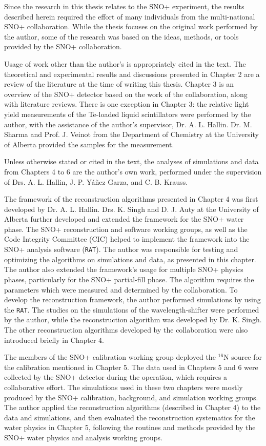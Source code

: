 Since the research in this thesis relates to the SNO+ experiment, the results described herein required the effort of many individuals from the multi-national SNO+ collaboration. While the thesis focuses on the original work performed by the author, some of the research was based on the ideas, methods, or tools provided by the SNO+ collaboration.

Usage of work other than the author's is appropriately cited in the text. The theoretical and experimental results and discussions presented in Chapter 2 are a review of the literature at the time of writing this thesis. Chapter 3 is an overview of the SNO+ detector based on the work of the collaboration, along with literature reviews. There is one exception in Chapter 3: the relative light yield measurements of the Te-loaded liquid scintillators were performed by the author, with the assistance of the author's supervisor, Dr. A. L. Hallin. Dr. M. Sharma and Prof. J. Veinot from the Department of Chemistry at the University of Alberta provided the samples for the measurement.

Unless otherwise stated or cited in the text, the analyses of simulations and data from Chapters 4 to 6 are the author's own work, performed under the supervision of Drs. A. L. Hallin, J. P. Y\'{a}\~{n}ez Garza, and C. B. Krauss.

The framework of the reconstruction algorithms presented in Chapter 4 was first developed by Dr. A. L. Hallin. Drs. K. Singh and D. J. Auty at the University of Alberta further developed and extended the framework for the SNO+ water phase. The SNO+ reconstruction and software working groups, as well as the Code Integrity Committee (CIC) helped to implement the framework into the SNO+ analysis software (\texttt{RAT}). The author was responsible for testing and optimizing the algorithms on simulations and data, as presented in this chapter. The author also extended the framework's usage for multiple SNO+ physics phases, particularly for the SNO+ partial-fill phase. The algorithm requires the parameters which were measured and determined by the collaboration. To develop the reconstruction framework, the author performed simulations by using the \texttt{RAT}. The studies on the simulations of the wavelength-shifter were performed by the author, while the reconstruction algorithm was developed by Dr. K. Singh. The other reconstruction algorithms developed by the collaboration were also introduced briefly in Chapter 4.

The members of the SNO+ calibration working group deployed the $^{16}$N source for the calibration mentioned in Chapter 5. The data used in Chapters 5 and 6 were collected by the SNO+ detector during the operation, which requires a collaborative effort. The simulations used in these two chapters were mostly produced by the SNO+ calibration, background, and simulation working groups. The author applied the reconstruction algorithms (described in Chapter 4) to the data and simulations, and then evaluated the reconstruction systematics for the water physics in Chapter 5, following the routines and methods provided by the SNO+ water physics and analysis working groups.

